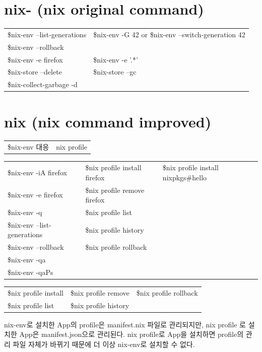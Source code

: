 \documentclass[11pt]{article}
\author{syryu}
\date{\today}
\title{}
\begin{document}
\tableofcontents


\section{nix- (nix original command)}
\label{sec:org60e168e}
\begin{center}
\begin{tabular}{ll}
\$nix-env --list-generations & \$nix-env -G 42  or \$nix-env --switch-generation 42\\
\$nix-env --rollback & \\
\$nix-env -e firefox & \$nix-env -e '.*'\\
\$nix-store --delete & \$nix-store --gc\\
\$nix-collect-garbage -d & \\
\end{tabular}
\end{center}
\section{nix (nix command improved)}
\label{sec:org2823e8a}
\begin{center}
\begin{tabular}{ll}
\$nix-env 대응 & nix profile\\
\end{tabular}
\end{center}

\begin{center}
\begin{tabular}{lll}
\$nix-env -iA firefox & \$nix profile install firefox & \$nix profile install nixpkgs\#hello\\
\$nix-env -e firefox & \$nix profile remove firefox & \\
\$nix-env -q & \$nix profile list & \\
\$nix-env --list-generations & \$nix profile history & \\
\$nix-env --rollback & \$nix profile rollback & \\
\$nix-env -qa &  & \\
\$nix-env -qaPs &  & \\
\end{tabular}
\end{center}

\begin{center}
\begin{tabular}{lll}
\$nix profile install & \$nix profile remove & \$nix profile rollback\\
\$nix profile list & \$nix profile history & \\
\end{tabular}
\end{center}
nix-env로 설치한 App의 profile은  manifest.nix 파일로 관리되지만, nix profile 로 설치한 App은 manifest.json으로 관리된다.
nix profile로 App을 설치하면 profile의 관리 파일 자체가 바뀌기 때문에 더 이상 nix-env로 설치할 수 없다.
\end{document}
